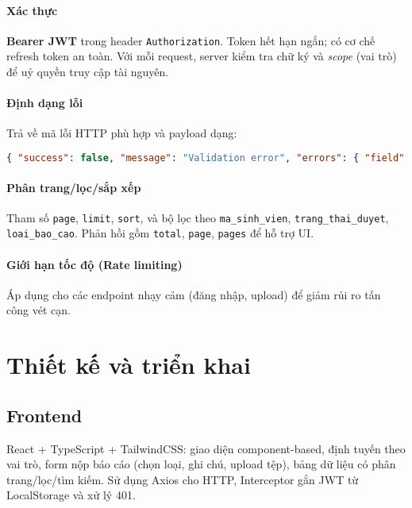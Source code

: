 \documentclass[conference]{IEEEtran}
\begin{document}
\paragraph{Xác thực} \textbf{Bearer JWT} trong header \texttt{Authorization}. Token hết hạn ngắn; có cơ chế refresh token an toàn. Với mỗi request, server kiểm tra chữ ký và \textit{scope} (vai trò) để uỷ quyền truy cập tài nguyên.

\paragraph{Định dạng lỗi} Trả về mã lỗi HTTP phù hợp và payload dạng:
\begin{lstlisting}[language=json]
{ "success": false, "message": "Validation error", "errors": { "field": "reason" } }
\end{lstlisting}

\paragraph{Phân trang/lọc/sắp xếp} Tham số \texttt{page}, \texttt{limit}, \texttt{sort}, và bộ lọc theo \texttt{ma\_sinh\_vien}, \texttt{trang\_thai\_duyet}, \texttt{loai\_bao\_cao}. Phản hồi gồm \texttt{total}, \texttt{page}, \texttt{pages} để hỗ trợ UI.

\paragraph{Giới hạn tốc độ (Rate limiting)} Áp dụng cho các endpoint nhạy cảm (đăng nhập, upload) để giảm rủi ro tấn công vét cạn.

\section{Thiết kế và triển khai}
\subsection{Frontend}
React + TypeScript + TailwindCSS: giao diện component-based, định tuyến theo vai trò, form nộp báo cáo (chọn loại, ghi chú, upload tệp), bảng dữ liệu có phân trang/lọc/tìm kiếm. Sử dụng Axios cho HTTP, Interceptor gắn JWT từ LocalStorage và xử lý 401.

\end{document}
